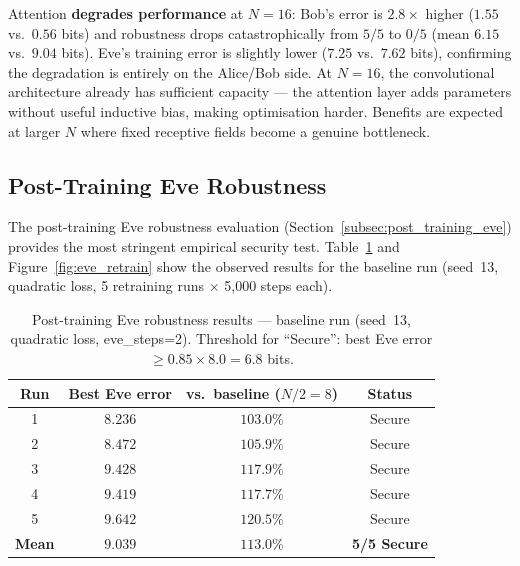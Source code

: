 \documentclass[12pt, a4paper]{article}
\begin{document}
Attention \textbf{degrades performance} at $N=16$: Bob's error is
$2.8\times$ higher ($1.55$ vs.\ $0.56$ bits) and robustness drops
catastrophically from $5/5$ to $0/5$ (mean $6.15$ vs.\ $9.04$ bits).
Eve's training error is slightly lower ($7.25$ vs.\ $7.62$ bits),
confirming the degradation is entirely on the Alice/Bob side.
At $N=16$, the convolutional architecture already has sufficient capacity
--- the attention layer adds parameters without useful inductive bias,
making optimisation harder. Benefits are expected at larger $N$ where
fixed receptive fields become a genuine bottleneck.
\subsection{Post-Training Eve Robustness}
\label{subsec:robustness_results_sec10}

The post-training Eve robustness evaluation (Section~\ref{subsec:post_training_eve}) provides the
most stringent empirical security test. Table~\ref{tab:robustness_results}
and Figure~\ref{fig:eve_retrain} show the observed results for the
baseline run (seed~13, quadratic loss, 5 retraining runs $\times$
5{,}000 steps each).

\begin{table}[H]
  \centering
  \caption{Post-training Eve robustness results --- baseline run
           (seed~13, quadratic loss, eve\_steps=2).
           Threshold for ``Secure'': best Eve error
           $\geq 0.85 \times 8.0 = 6.8$ bits.}
  \label{tab:robustness_results}
  \renewcommand{\arraystretch}{1.35}
  \begin{tabular}{@{} c c c c @{}}
    \toprule
    \textbf{Run} & \textbf{Best Eve error} &
    \textbf{vs.\ baseline ($N/2=8$)} & \textbf{Status} \\
    \midrule
    1 & $8.236$ & $103.0\%$ & \textcolor{GreenOK}{Secure} \\
    2 & $8.472$ & $105.9\%$ & \textcolor{GreenOK}{Secure} \\
    3 & $9.428$ & $117.9\%$ & \textcolor{GreenOK}{Secure} \\
    4 & $9.419$ & $117.7\%$ & \textcolor{GreenOK}{Secure} \\
    5 & $9.642$ & $120.5\%$ & \textcolor{GreenOK}{Secure} \\
    \midrule
    \textbf{Mean} & $\mathbf{9.039}$ & $\mathbf{113.0\%}$ &
    \textbf{5/5 Secure} \\
    \bottomrule
  \end{tabular}
\end{table}
\end{document}
